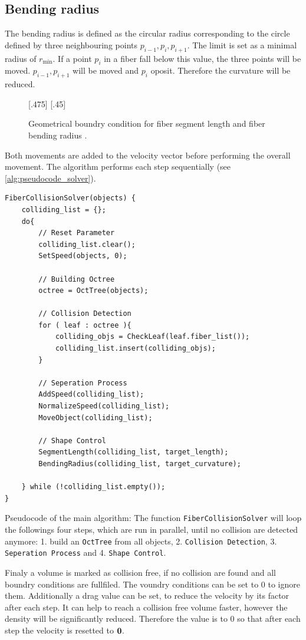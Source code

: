 \subsection{Bending radius}
% 
The bending radius is defined as the circular radius corresponding to the circle defined by three neighbouring points $p_{i-1}, p_{i}, p_{i+1}$. 
The limit is set as a minimal radius of $r_{\min}$.
If a point $p_{i}$ in a fiber fall below this value, the three points will be moved.
$p_{i-1},p_{i+1}$ will be moved \dummy and $p_{i}$ oposit.
Therefore the curvature will be reduced.
% 
\begin{figure}[!t]
    \centering
    \def\tikzheight{.40\textwidth}
    [.475\textwidth]{
    }\hfill
    [.45\textwidth]{
    }
	\caption{Geometrical boundry condition for fiber segment length \segLength and fiber bending radius \segRadius.}
	\label{fig:model_circle}
\end{figure}
% 
\newline
Both movements are added to the velocity vector before performing the overall movement.
The algorithm performs each step sequentially (see \cref{alg:pseudocode_solver}).
\begin{lstfloat}[!tb]
\lstset{style=cpp}

\begin{lstlisting}[]
FiberCollisionSolver(objects) {
	colliding_list = {};
	do{
		// Reset Parameter
		colliding_list.clear();
		SetSpeed(objects, 0);
		
		// Building Octree
		octree = OctTree(objects);
		
		// Collision Detection
		for ( leaf : octree ){
			colliding_objs = CheckLeaf(leaf.fiber_list());
			colliding_list.insert(colliding_objs);
		}
		
		// Seperation Process
		AddSpeed(colliding_list);
		NormalizeSpeed(colliding_list);
		MoveObject(colliding_list);
		
		// Shape Control
		SegmentLength(colliding_list, target_length);
		BendingRadius(colliding_list, target_curvature);
		
	} while (!colliding_list.empty());
}
\end{lstlisting}
\caption{Pseudocode of the main algorithm: The function \texttt{FiberCollisionSolver} will loop the followings four steps, which are run in parallel, until no collision are detected anymore: 1. build an \texttt{OctTree} from all objects, 2. \texttt{Collision Detection}, 3. \texttt{Seperation Process} and 4. \texttt{Shape Control}.}
\label{alg:pseudocode_solver}
\end{lstfloat}
% 
Finaly a volume is marked as collision free, if no collision are found and all boundry conditions are fullfiled. 
The voundry conditions can be set to 0 to ignore them.
Additionally a drag value can be set, to reduce the velocity by its factor after each step.
It can help to reach a collision free volume faster, however the density will be significantly reduced.
Therefore the value is to 0 so that after each step the velocity is resetted to $\mathbf{0}$. 
% 
% 
